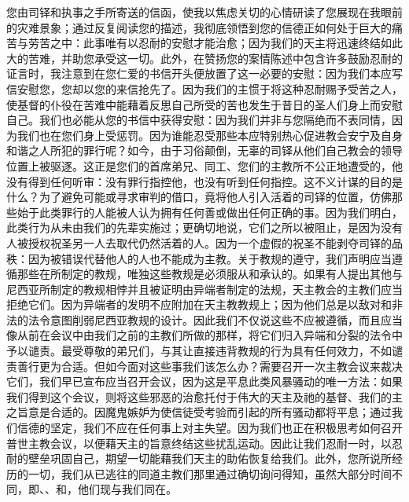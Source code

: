 您由司铎和执事之手所寄送的信函，使我以焦虑关切的心情研读了您展现在我眼前的灾难景象；通过反复阅读您的描述，我彻底领悟到您的信德正如何处于巨大的痛苦与劳苦之中：此事唯有以忍耐的安慰才能治愈；因为我们的天主将迅速终结如此大的苦难，并助您承受这一切。此外，在赞扬您的案情陈述中包含许多鼓励忍耐的证言时，我注意到在您仁爱的书信开头便放置了这一必要的安慰：因为我们本应写信安慰您，您却以您的来信抢先了。因为我们的主惯于将这种忍耐赐予受苦之人，使基督的仆役在苦难中能藉着反思自己所受的苦也发生于昔日的圣人们身上而安慰自己。我们也必能从您的书信中获得安慰：因为我们并非与您隔绝而不表同情，因为我们也在您们身上受惩罚。因为谁能忍受那些本应特别热心促进教会安宁及自身和谐之人所犯的罪行呢？如今，由于习俗颠倒，无辜的司铎从他们自己教会的领导位置上被驱逐。这正是您们的首席弟兄、同工、您们的主教所不公正地遭受的，他没有得到任何听审：没有罪行指控他，也没有听到任何指控。这不义计谋的目的是什么？为了避免可能或寻求审判的借口，竟将他人引入活着的司铎的位置，仿佛那些始于此类罪行的人能被人认为拥有任何善或做出任何正确的事。因为我们明白，此类行为从未由我们的先辈实施过；更确切地说，它们之所以被阻止，是因为没有人被授权祝圣另一人去取代仍然活着的人。因为一个虚假的祝圣不能剥夺司铎的品秩：因为被错误代替他人的人也不能成为主教。关于教规的遵守，我们声明应当遵循那些在所制定的教规，唯独这些教规是必须服从和承认的。如果有人提出其他与尼西亚所制定的教规相悖并且被证明由异端者制定的法规，天主教会的主教们应当拒绝它们。因为异端者的发明不应附加在天主教教规上；因为他们总是以敌对和非法的法令意图削弱尼西亚教规的设计。因此我们不仅说这些不应被遵循，而且应当像从前在会议中由我们之前的主教们所做的那样，将它们归入异端和分裂的法令中予以谴责。最受尊敬的弟兄们，与其让直接违背教规的行为具有任何效力，不如谴责善行更为合适。但如今面对这些事我们该怎么办？需要召开一次主教会议来裁决它们，我们早已宣布应当召开会议，因为这是平息此类风暴骚动的唯一方法：如果我们得到这个会议，则将这些邪恶的治愈托付于伟大的天主及祂的基督、我们的主之旨意是合适的。因魔鬼嫉妒为使信徒受考验而引起的所有骚动都将平息；通过我们信德的坚定，我们不应在任何事上对主失望。因为我们也正在积极思考如何召开普世主教会议，以便藉天主的旨意终结这些扰乱运动。因此让我们忍耐一时，以忍耐的壁垒巩固自己，期望一切能藉我们天主的助佑恢复给我们。此外，您所说所经历的一切，我们从已逃往的同道主教们那里通过确切询问得知，虽然大部分时间不同，即、、和，他们现与我们同在。\par

